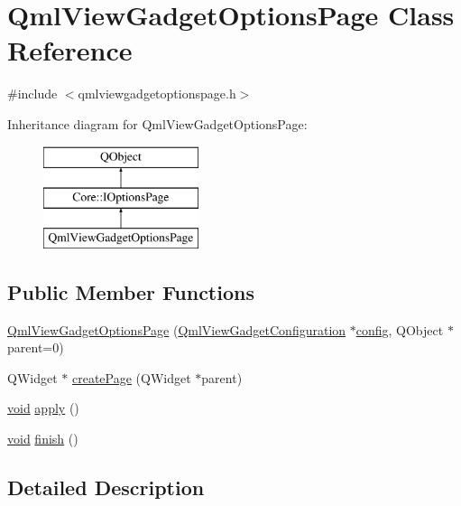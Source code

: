 \hypertarget{class_qml_view_gadget_options_page}{\section{Qml\-View\-Gadget\-Options\-Page Class Reference}
\label{class_qml_view_gadget_options_page}
}


{\ttfamily \#include $<$qmlviewgadgetoptionspage.\-h$>$}

Inheritance diagram for Qml\-View\-Gadget\-Options\-Page\-:\begin{figure}[H]
\begin{center}
\leavevmode
\includegraphics[height=3.000000cm]{class_qml_view_gadget_options_page}
\end{center}
\end{figure}
\subsection*{Public Member Functions}
\begin{DoxyCompactItemize}
\item 
\hyperlink{group___o_p_map_plugin_gaf6860d14e2ae756100a2765d50a6d9b0}{Qml\-View\-Gadget\-Options\-Page} (\hyperlink{class_qml_view_gadget_configuration}{Qml\-View\-Gadget\-Configuration} $\ast$\hyperlink{deflate_8c_a4473b5227787415097004fd39f55185e}{config}, Q\-Object $\ast$parent=0)
\item 
Q\-Widget $\ast$ \hyperlink{group___o_p_map_plugin_gabea978f47d48fc92ec7e5a0ed8d88fe0}{create\-Page} (Q\-Widget $\ast$parent)
\item 
\hyperlink{group___u_a_v_objects_plugin_ga444cf2ff3f0ecbe028adce838d373f5c}{void} \hyperlink{group___o_p_map_plugin_gae54bde0f44f72b28df2d9722d829d930}{apply} ()
\item 
\hyperlink{group___u_a_v_objects_plugin_ga444cf2ff3f0ecbe028adce838d373f5c}{void} \hyperlink{group___o_p_map_plugin_ga8730978634b18a85389188571ad7fec5}{finish} ()
\end{DoxyCompactItemize}


\subsection{Detailed Description}


